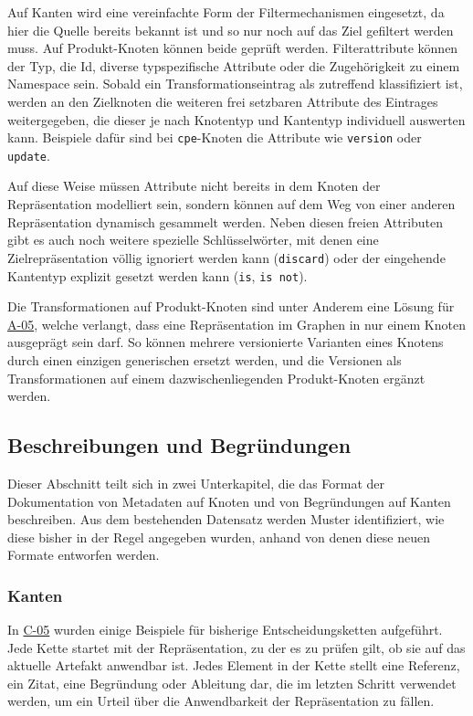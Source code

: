 Auf Kanten wird eine vereinfachte Form der Filtermechanismen eingesetzt, da hier die Quelle bereits bekannt ist und so nur noch auf das Ziel gefiltert werden muss.
Auf Produkt-Knoten können beide geprüft werden.
Filterattribute können der Typ, die Id, diverse typspezifische Attribute oder die Zugehörigkeit zu einem Namespace sein.
Sobald ein Transformationseintrag als zutreffend klassifiziert ist, werden an den Zielknoten die weiteren frei setzbaren Attribute des Eintrages weitergegeben, die dieser je nach Knotentyp und Kantentyp individuell auswerten kann.
Beispiele dafür sind bei \texttt{cpe}-Knoten die Attribute wie \texttt{version} oder \texttt{update}.

Auf diese Weise müssen Attribute nicht bereits in dem Knoten der Repräsentation modelliert sein, sondern können auf dem Weg von einer anderen Repräsentation dynamisch gesammelt werden.
Neben diesen freien Attributen gibt es auch noch weitere spezielle Schlüsselwörter, mit denen eine Zielrepräsentation völlig ignoriert werden kann (\texttt{discard}) oder der eingehende Kantentyp explizit gesetzt werden kann (\texttt{is}, \texttt{is not}).

Die Transformationen auf Produkt-Knoten sind unter Anderem eine Lösung für \hyperref[subsec:req-unique-product-representations]{A-05}, welche verlangt, dass eine Repräsentation im Graphen in nur einem Knoten ausgeprägt sein darf.
So können mehrere versionierte Varianten eines Knotens durch einen einzigen generischen ersetzt werden, und die Versionen als Transformationen auf einem dazwischenliegenden Produkt-Knoten ergänzt werden.

\subsection{Beschreibungen und Begründungen}\label{subsec:model-rationale}

Dieser Abschnitt teilt sich in zwei Unterkapitel, die das Format der Dokumentation von Metadaten auf Knoten und von Begründungen auf Kanten beschreiben.
Aus dem bestehenden Datensatz werden Muster identifiziert, wie diese bisher in der Regel angegeben wurden, anhand von denen diese neuen Formate entworfen werden.

\subsubsection{Kanten}

In \hyperref[subsec:c-05-reason-not-good-enough]{C-05} wurden einige Beispiele für bisherige Entscheidungsketten aufgeführt.
Jede Kette startet mit der Repräsentation, zu der es zu prüfen gilt, ob sie auf das aktuelle Artefakt anwendbar ist.
Jedes Element in der Kette stellt eine Referenz, ein Zitat, eine Begründung oder Ableitung dar, die im letzten Schritt verwendet werden, um ein Urteil über die Anwendbarkeit der Repräsentation zu fällen.

